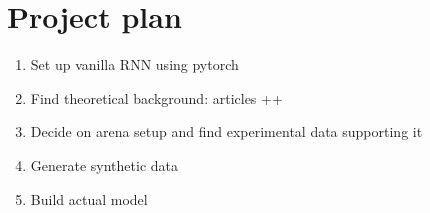 \section{Project plan}\label{sec:project_plan}
\begin{enumerate}
    \item Set up vanilla RNN using pytorch
    \item Find theoretical background: articles ++
    \item Decide on arena setup and find experimental data supporting it
    \item Generate synthetic data
    \item Build actual model
\end{enumerate}

